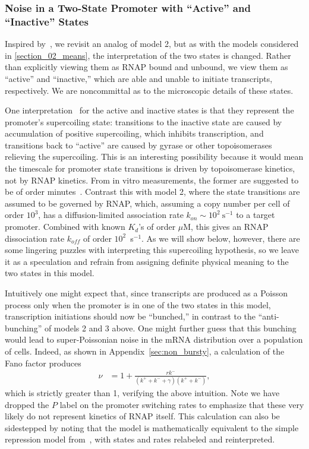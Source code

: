 \subsubsection{Noise in a Two-State Promoter with ``Active'' and ``Inactive''
States}

Inspired by~\cite{Razo-Mejia2020}, we revisit an analog of model 2, but as with
the models considered in \ref{section_02_means}, the interpretation of the two
states is changed. Rather than explicitly viewing them as RNAP bound and
unbound, we view them as ``active'' and ``inactive,'' which are able and unable
to initiate transcripts, respectively. We are noncommittal as to the microscopic
details of these states.

One interpretation~\cite{Chong2014, Sevier2016} for the active and inactive
states is that they represent the promoter's supercoiling state: transitions to
the inactive state are caused by accumulation of positive supercoiling, which
inhibits transcription, and transitions back to ``active'' are caused by gyrase
or other topoisomerases relieving the supercoiling. This is an interesting
possibility because it would mean the timescale for promoter state transitions
is driven by topoisomerase kinetics, not by RNAP kinetics. From in vitro
measurements, the former are suggested to be of order minutes~\cite{Chong2014}.
Contrast this with model 2, where the state transitions are assumed to be
governed by RNAP, which, assuming a copy number per cell of order $10^3$, has a
diffusion-limited association rate $k_{on} \sim 10^2~\text{s}^{-1}$ to a target
promoter. Combined with known $K_d$'s of order $\mu$M, this gives an RNAP
dissociation rate $k_{off}$ of order $10^2$~s$^{-1}$. As we will show below,
however, there are some lingering puzzles with interpreting this supercoiling
hypothesis, so we leave it as a speculation and refrain from assigning definite
physical meaning to the two states in this model.

Intuitively one might expect that, since transcripts are produced as a Poisson
process only when the promoter is in one of the two states in this model,
transcription initiations should now be ``bunched,'' in contrast to the
``anti-bunching'' of models 2 and 3 above. One might further guess that this
bunching would lead to super-Poissonian noise in the mRNA distribution over a
population of cells.  Indeed, as shown in Appendix~\ref{sec:non_bursty}, a
calculation of the Fano factor produces
\begin{align}
\nu &= 1 + \frac{r k^-}{(k^+ + k^- + \gamma)(k^+ + k^-)},
\end{align}
which is strictly greater than 1, verifying the above intuition. Note we have
dropped the $P$ label on the promoter switching rates to emphasize that these
very likely do not represent kinetics of RNAP itself. This calculation can also
be sidestepped by noting that the model is mathematically equivalent to the
simple repression model from~\cite{Jones2014}, with states and rates relabeled
and reinterpreted.

